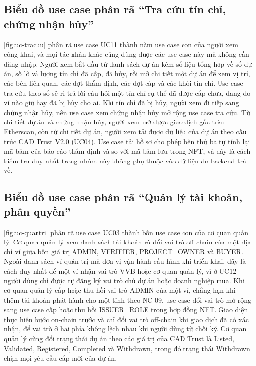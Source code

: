 \HinhUCDashboard

\subsection*{Biểu đồ use case phân rã ``Tra cứu tín chỉ, chứng nhận hủy''}
\label{subsec:uc-tracuu}

\autoref{fig:uc-tracuu} phân rã use case UC11 thành năm use case con của người xem công khai, và mọi tác nhân khác cũng dùng được các use case này mà không cần đăng nhập. Người xem bắt đầu từ danh sách dự án kèm số liệu tổng hợp về số dự án, số lô và lượng tín chỉ đã cấp, đã hủy, rồi mở chi tiết một dự án để xem vị trí, các bên liên quan, các đợt thẩm định, các đợt cấp và các khối tín chỉ. Use case tra cứu theo số sê-ri trả lời câu hỏi một tín chỉ cụ thể đã được cấp chưa, đang do ví nào giữ hay đã bị hủy cho ai. Khi tín chỉ đã bị hủy, người xem đi tiếp sang chứng nhận hủy, nên use case xem chứng nhận hủy mở rộng use case tra cứu. Từ chi tiết dự án và chứng nhận hủy, người xem mở được giao dịch gốc trên Etherscan, còn từ chi tiết dự án, người xem tải được dữ liệu của dự án theo cấu trúc CAD Trust V2.0 (UC04). Use case tải hồ sơ cho phép bên thứ ba tự tính lại mã băm của báo cáo thẩm định và so với mã băm lưu trong NFT, và đây là cách kiểm tra duy nhất trong nhóm này không phụ thuộc vào dữ liệu do backend trả về.

\HinhUCTraCuu

\FloatBarrier
\subsection*{Biểu đồ use case phân rã ``Quản lý tài khoản, phân quyền''}
\label{subsec:uc-quantri}

\autoref{fig:uc-quantri} phân rã use case UC03 thành bốn use case con của cơ quan quản lý. Cơ quan quản lý xem danh sách tài khoản và đổi vai trò off-chain của một địa chỉ ví giữa bốn giá trị ADMIN, VERIFIER, PROJECT\_OWNER và BUYER. Ngoài danh sách ví quản trị mà đơn vị vận hành cấu hình khi triển khai, đây là cách duy nhất để một ví nhận vai trò VVB hoặc cơ quan quản lý, vì ở UC12 người dùng chỉ được tự đăng ký vai trò chủ dự án hoặc doanh nghiệp mua. Khi cơ quan quản lý cấp hoặc thu hồi vai trò ADMIN của một ví, chẳng hạn khi thêm tài khoản phát hành cho một tỉnh theo NC-09, use case đổi vai trò mở rộng sang use case cấp hoặc thu hồi ISSUER\_ROLE trong hợp đồng NFT. Giao diện thực hiện bước on-chain trước và chỉ đổi vai trò off-chain khi giao dịch đã có xác nhận, để vai trò ở hai phía không lệch nhau khi người dùng từ chối ký. Cơ quan quản lý cũng đổi trạng thái dự án theo các giá trị của CAD Trust là Listed, Validated, Registered, Completed và Withdrawn, trong đó trạng thái Withdrawn chặn mọi yêu cầu cấp mới của dự án.

